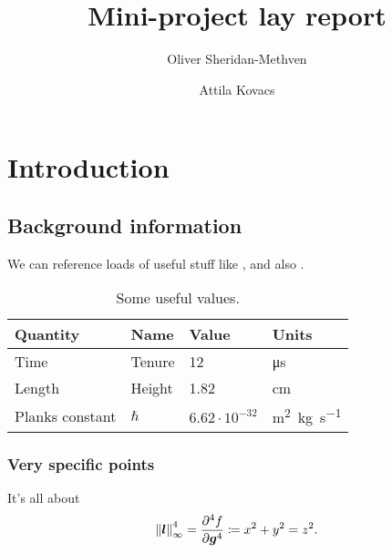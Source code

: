 \documentclass[english,twoside,10pt]{extarticle}
\title{Mini-project lay report}
\author{Oliver Sheridan-Methven \and Attila Kovacs}
\begin{document}




\section{Introduction}
\subsection{Background information}

\lipsum[2]

We can reference loads of useful stuff like , and also .

\begin{table}[htb]
    \centering
    \begin{tabular}{llll}
    	Quantity        & Name      & Value                 & Units                                \\ \hline
    	Time            & Tenure    & 12                    & \si{\micro\second}                   \\
    	Length          & Height    & 1.82                  & \si{\centi\meter}                    \\
    	Planks constant & $ \hbar $ & $ 6.62\cdot10^{-32} $ & \si{\meter^2.\kilogram.\second^{-1}}
    \end{tabular}
    \caption{Some useful values.}
    \label{tab:some_useful_values}
\end{table}


\subsubsection{Very specific points}
\lipsum[75] It's all about 
\begin{equation}
 \norm{\bm{l}}_\infty^4 = \pdv[4]{f}{\bm{g}}\coloneqq x^2 + y^2 = z^2.
\end{equation}
\end{document}
